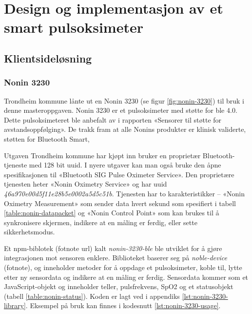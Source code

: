 \chapter{Design og implementasjon av et smart pulsoksimeter}
\label{ch:implementation1}

\section{Klientsideløsning}
\subsection{Nonin 3230}
Trondheim kommune lånte ut en Nonin 3230 (se figur \ref{fig:nonin-3230}) til bruk i denne masteroppgaven.
Nonin 3230 er et pulsoksimeter med støtte for \gls{ble} 4.0. Dette pulsoksimeteret ble anbefalt av \citet{austad2016sensorer}
i rapporten «Sensorer til støtte for avstandsoppfølging». De trakk fram at alle Nonins produkter
er klinisk validerte, støtten for Bluetooth Smart,   

Utgaven Trondheim kommune har kjøpt inn bruker en proprietær Bluetooth-tjeneste med 128 bit \gls{uuid}.
I nyere utgaver kan man også bruke den åpne spesifikasjonen til «Bluetooth SIG Pulse Oximeter Service».
Den proprietære tjenesten heter «Nonin Oximetry Service» og har \gls{uuid} \textit{46a970e00d5f11e28b5e0002a5d5c51b}.
Tjenesten har to karakteristikker -- «Nonin Oximetry Measurement» som sender data hvert sekund som spesifiert
i tabell \ref{table:nonin-datapacket} og «Nonin Control Point» som kan brukes til å synkronisere skjermen,
indikere at en måling er ferdig, eller sette sikkerhetsmodus. 

Et \gls{npm}-biblotek (fotnote url) kalt \textit{nonin-3230-ble} ble utviklet for å gjøre integrasjonen mot sensoren enklere.
Biblioteket baserer seg på \textit{noble-device} (fotnote), og inneholder metoder for å oppdage et pulsoksimeter,
koble til, lytte etter ny sensordata og indikere at en måling er ferdig. Sensordata kommer som et JavaScript-objekt
og inneholder teller, pulsfrekvens, SpO2 og et statusobjekt (tabell \ref{table:nonin-status}).
Koden er lagt ved i appendiks \ref{lst:nonin-3230-library}.
Eksempel på bruk kan finnes i kodesnutt \ref{lst:nonin-3230-usage}.


